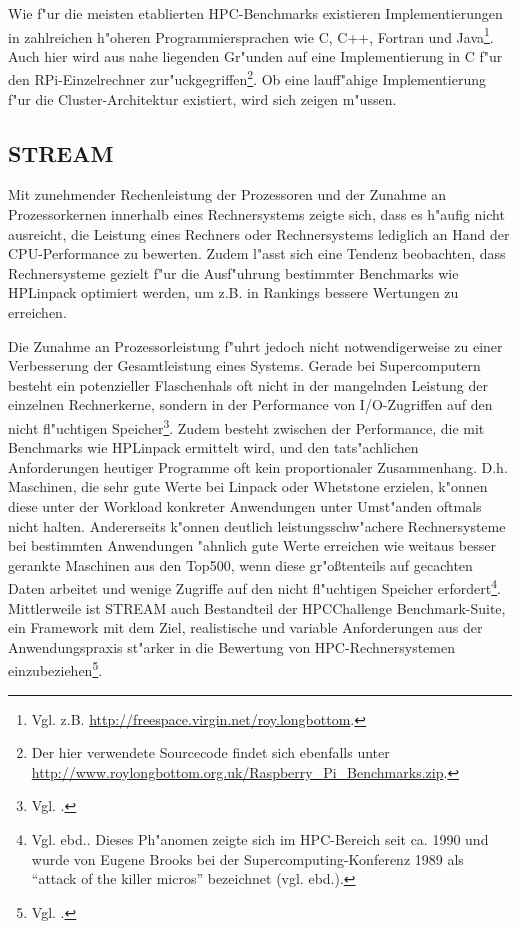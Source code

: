 Wie f"ur die meisten etablierten HPC-Benchmarks existieren Implementierungen in zahlreichen h"oheren Programmiersprachen wie C, C++, Fortran und Java\footnote{Vgl. z.B. \url{http://freespace.virgin.net/roy.longbottom}.}. Auch hier wird aus nahe liegenden Gr"unden auf eine Implementierung in C f"ur den RPi-Einzelrechner zur"uckgegriffen\footnote{Der hier verwendete Sourcecode findet sich ebenfalls unter \url{http://www.roylongbottom.org.uk/Raspberry_Pi_Benchmarks.zip}.}. Ob eine lauff"ahige Implementierung f"ur die Cluster-Architektur existiert, wird sich zeigen m"ussen. 

\subsection{STREAM}\label{STREAM}

Mit zunehmender Rechenleistung der Prozessoren und der Zunahme an Prozessorkernen innerhalb eines Rechnersystems zeigte sich, dass es h"aufig nicht ausreicht, die Leistung eines Rechners oder Rechnersystems lediglich an Hand der CPU-Performance zu bewerten. Zudem l"asst sich eine Tendenz beobachten, dass Rechnersysteme gezielt f"ur die Ausf"uhrung bestimmter Benchmarks wie HPLinpack optimiert werden, um z.B. in Rankings bessere Wertungen zu erreichen. 

Die Zunahme an Prozessorleistung f"uhrt jedoch nicht notwendigerweise zu einer Verbesserung der Gesamtleistung eines Systems. Gerade bei Supercomputern besteht ein potenzieller Flaschenhals oft nicht in der mangelnden Leistung der einzelnen Rechnerkerne, sondern in der Performance von I/O-Zugriffen auf den nicht fl"uchtigen Speicher\footnote{Vgl. \cite{mcc95}.}. Zudem besteht zwischen der Performance, die mit Benchmarks wie HPLinpack ermittelt wird, und den tats"achlichen Anforderungen heutiger Programme oft kein proportionaler Zusammenhang. D.h. Maschinen, die sehr gute Werte bei Linpack oder Whetstone erzielen, k"onnen diese unter der Workload konkreter Anwendungen unter Umst"anden oftmals nicht halten. Andererseits k"onnen deutlich leistungsschw"achere Rechnersysteme bei bestimmten Anwendungen "ahnlich gute Werte erreichen wie weitaus besser gerankte Maschinen aus den Top500, wenn diese gr"o\ss tenteils auf gecachten Daten arbeitet und wenige Zugriffe auf den nicht fl"uchtigen Speicher erfordert\footnote{Vgl. ebd.. Dieses Ph"anomen zeigte sich im HPC-Bereich seit ca. 1990 und wurde von Eugene Brooks bei der Supercomputing-Konferenz 1989 als "`attack of the killer micros"' bezeichnet (vgl. ebd.).}. Mittlerweile ist STREAM auch Bestandteil der HPCChallenge Benchmark-Suite, ein Framework mit dem Ziel, realistische und variable Anforderungen aus der Anwendungspraxis st"arker in die Bewertung von HPC-Rechnersystemen einzubeziehen\footnote{Vgl. \cite{lus05}.}.

